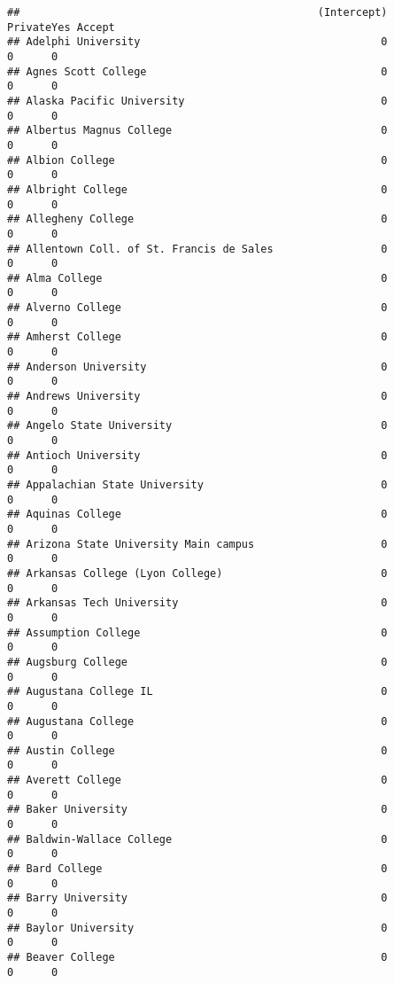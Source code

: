 \documentclass[
]{article}
\begin{document}
\begin{verbatim}
##                                               (Intercept) PrivateYes Accept
## Adelphi University                                      0          0      0
## Agnes Scott College                                     0          0      0
## Alaska Pacific University                               0          0      0
## Albertus Magnus College                                 0          0      0
## Albion College                                          0          0      0
## Albright College                                        0          0      0
## Allegheny College                                       0          0      0
## Allentown Coll. of St. Francis de Sales                 0          0      0
## Alma College                                            0          0      0
## Alverno College                                         0          0      0
## Amherst College                                         0          0      0
## Anderson University                                     0          0      0
## Andrews University                                      0          0      0
## Angelo State University                                 0          0      0
## Antioch University                                      0          0      0
## Appalachian State University                            0          0      0
## Aquinas College                                         0          0      0
## Arizona State University Main campus                    0          0      0
## Arkansas College (Lyon College)                         0          0      0
## Arkansas Tech University                                0          0      0
## Assumption College                                      0          0      0
## Augsburg College                                        0          0      0
## Augustana College IL                                    0          0      0
## Augustana College                                       0          0      0
## Austin College                                          0          0      0
## Averett College                                         0          0      0
## Baker University                                        0          0      0
## Baldwin-Wallace College                                 0          0      0
## Bard College                                            0          0      0
## Barry University                                        0          0      0
## Baylor University                                       0          0      0
## Beaver College                                          0          0      0

\end{verbatim}
\end{document}
